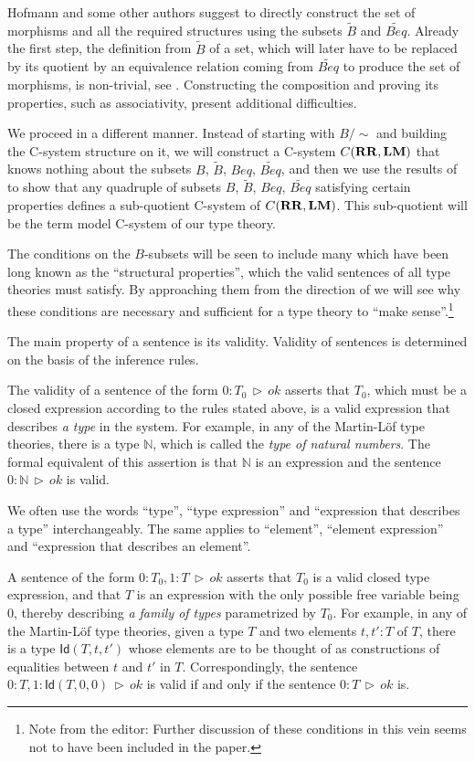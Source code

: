 \documentclass[onecolumn,12pt]{amsart}
\numberwithin{proposition}{subsection}
\newcommand{\nn}{{\mathbb N}}
\newcommand{\nat}{\nn}
\newcommand{\wt}{\widetilde}
\newcommand{\RR}{{\bf RR}}
\newcommand{\LM}{{\bf LM}}
\DeclareMathOperator{\rh}{\,\rhd\,}
\newcommand{\Id}{\ensuremath{\mathsf{Id}}}
\newcommand{\editorfootnote}[1]{\footnote{Note from the editor: #1}}
\begin{document}
Hofmann \cite{Hofmann} and some other authors suggest to directly construct the set of
morphisms and all the required structures using the subsets $\wt{B}$ and
$\wt{Beq}$. Already the first step, the definition from $\wt{B}$ of a set, which
will later have to be replaced by its quotient by an equivalence relation coming from
$\wt{Beq}$ to produce the set of morphisms, is non-trivial, see \cite[Def. 2.11,
  p.~97]{Hofmann}. Constructing the composition and proving its properties, such
as associativity, present additional difficulties.

We proceed in a different manner. Instead of starting with $B/{\sim}$ and
building the C-system structure on it, we will construct a C-system
$C(\RR,\LM)$ that knows nothing about the subsets
$B$, $\wt{B}$, $Beq$, $\wt{Beq}$, and then we use the results of \cite{Csubsystems}
to show that any quadruple of subsets $B$, $\wt{B}$, $Beq$, $\wt{Beq}$ satisfying
certain properties defines a sub-quotient C-system of $C(\RR,\LM)$. This
sub-quotient will be the term model C-system of our type theory.

The conditions on the $B$-subsets will be seen to include many
which have been long known as the ``structural properties'', which the valid
sentences of all type theories must satisfy. By approaching them from the
direction of \cite{Csubsystems} we will see why these conditions are
necessary and sufficient for a type theory to ``make sense''.\editorfootnote{Further discussion
  of these conditions in this vein seems not to have been included in the paper.}

The main property of a sentence is its validity. Validity of sentences is
determined on the basis of the inference rules.

The validity of a sentence of the form $0:T_0\rh ok$ asserts that $T_0$, which
must be a closed expression according to the rules stated above, is a valid
expression that describes {\em a type} in the system. For example, in any of
the Martin-L\"{o}f type theories, there is a type $\nat$, which is called the
{\em type of natural numbers}. The formal equivalent of this assertion is that $\nat$
is an expression and the sentence $0:\nat\rh ok$ is valid.

We often use the words ``type'', ``type expression'' and ``expression that
describes a type'' interchangeably. The same applies to ``element'', ``element
expression'' and ``expression that describes an element''.

A sentence of the form $0:T_0,1:T\rh ok$ asserts that $T_0$ is a valid closed
type expression, and that $T$ is an expression with the only possible free variable
being $0$, thereby describing {\em a family of types} parametrized by $T_0$. For
example, in any of the Martin-L\"{o}f type theories, given a type $T$ and two
elements $t,t':T$ of $T$, there is a type $\Id(T,t,t')$ whose elements are to
be thought of as constructions of equalities between $t$ and $t'$ in
$T$. Correspondingly, the sentence $0:T, 1:\Id(T,0,0) \rh ok$ is valid if and
only if the sentence $0:T\rh ok$ is.
\end{document}

